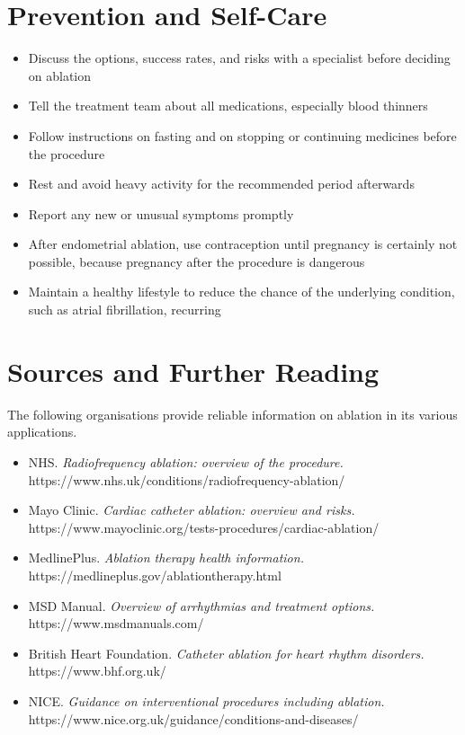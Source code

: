 \section*{Prevention and Self-Care}
\begin{itemize}
    \item Discuss the options, success rates, and risks with a specialist before deciding on ablation
    \item Tell the treatment team about all medications, especially blood thinners
    \item Follow instructions on fasting and on stopping or continuing medicines before the procedure
    \item Rest and avoid heavy activity for the recommended period afterwards
    \item Report any new or unusual symptoms promptly
    \item After endometrial ablation, use contraception until pregnancy is certainly not possible, because pregnancy after the procedure is dangerous
    \item Maintain a healthy lifestyle to reduce the chance of the underlying condition, such as atrial fibrillation, recurring
\end{itemize}

\section*{Sources and Further Reading}
The following organisations provide reliable information on ablation in its various applications.

\begin{itemize}
    \item NHS. \textit{Radiofrequency ablation: overview of the procedure.} https://www.nhs.uk/conditions/radiofrequency-ablation/
    \item Mayo Clinic. \textit{Cardiac catheter ablation: overview and risks.} https://www.mayoclinic.org/tests-procedures/cardiac-ablation/
    \item MedlinePlus. \textit{Ablation therapy health information.} https://medlineplus.gov/ablationtherapy.html
    \item MSD Manual. \textit{Overview of arrhythmias and treatment options.} https://www.msdmanuals.com/
    \item British Heart Foundation. \textit{Catheter ablation for heart rhythm disorders.} https://www.bhf.org.uk/
    \item NICE. \textit{Guidance on interventional procedures including ablation.} https://www.nice.org.uk/guidance/conditions-and-diseases/
\end{itemize}
